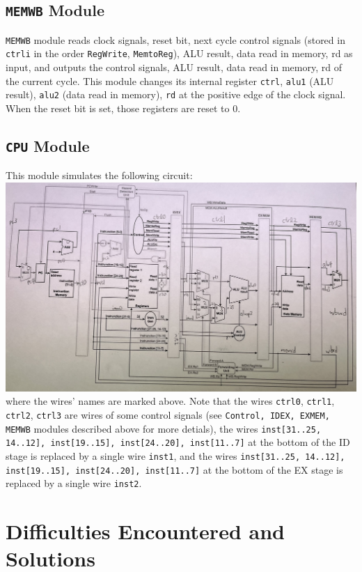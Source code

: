 \subsection{\texttt{MEMWB} Module}

\texttt{MEMWB} module reads clock signals, reset bit, next cycle control signals (stored in \texttt{ctrli} in the order \texttt{RegWrite}, \texttt{MemtoReg}), ALU result, data read in memory, rd as input, and outputs the control signals, ALU result, data read in memory, rd of the current cycle. This module changes its internal register \texttt{ctrl}, \texttt{alu1} (ALU result), \texttt{alu2} (data read in memory), \texttt{rd} at the positive edge of the clock signal. When the reset bit is set, those registers are reset to $0$.

\subsection{\texttt{CPU} Module}

This module simulates the following circuit:\\
\includegraphics[width=15cm]{all.JPG}\\
where the wires' names are marked above. Note that the wires \texttt{ctrl0}, \texttt{ctrl1}, \texttt{ctrl2}, \texttt{ctrl3} are wires of some control signals (see \texttt{Control, IDEX, EXMEM, MEMWB} modules described above for more detials), the wires \texttt{inst[31..25, 14..12], inst[19..15], inst[24..20], inst[11..7]} at the bottom of the ID stage is replaced by a single wire \texttt{inst1}, and the wires \texttt{inst[31..25, 14..12], inst[19..15], inst[24..20], inst[11..7]} at the bottom of the EX stage is replaced by a single wire \texttt{inst2}.

\section{Difficulties Encountered and Solutions}

